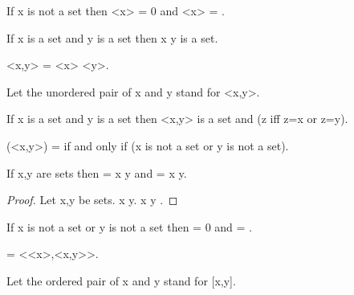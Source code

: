 \documentclass[a4paper,draft]{amsproc}
\begin{document}
\begin{forthel}
\begin{theorem}[44b]
If x is not a set then \bigcap <x> = 0
and \bigcup <x> = .
\end{theorem}

\begin{axiom}[IV]
If x is a set and y is a set then x \cup y is a set.
\end{axiom}

\begin{definition}[45] <x,y> = <x> \cup <y>.\end{definition}
Let the unordered pair of x and y stand for <x,y>.


\begin{theorem}[46a]
If x is a set and y is a set 
then <x,y> is a set and (z  iff z=x or z=y). 
\end{theorem}

\begin{theorem}[46b]
(<x,y>) =  if and only if (x is not a set or y is not a set).
\end{theorem}

\begin{theorem}[47a]
If x,y are sets then  = x \cap y
and  = x \cup y.
\end{theorem}
\begin{proof}
Let x,y be sets.
 \subset x \cup y.
x \cup y \subset {}.
\end{proof}

\begin{theorem}[47b]
If x is not a set or y is not a set then
 = 0 and  = .
\end{theorem}


\begin{definition}[48] [x,y] = <<x>,<x,y>>.\end{definition}
Let the ordered pair of x and y stand for [x,y].


\end{forthel}
\end{document}
